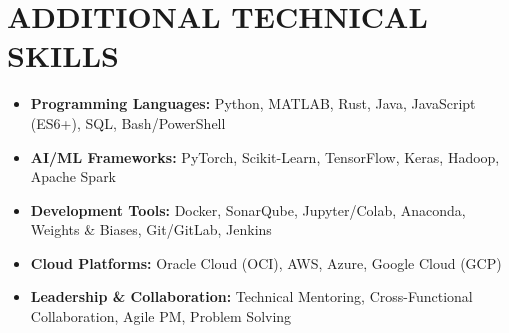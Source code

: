 \documentclass[a4paper,11pt]{article}
\begin{document}
\section{ADDITIONAL TECHNICAL SKILLS}
\begin{itemize}[leftmargin=0.15in, label={}]
    \small\item \textbf{Programming Languages:} Python, MATLAB, Rust, Java, JavaScript (ES6+), SQL, Bash/PowerShell
    \small\item \textbf{AI/ML Frameworks:} PyTorch, Scikit-Learn, TensorFlow, Keras, Hadoop, Apache Spark
    \small\item \textbf{Development Tools:} Docker, SonarQube, Jupyter/Colab, Anaconda, Weights \& Biases, Git/GitLab, Jenkins
    \small\item \textbf{Cloud Platforms:} Oracle Cloud (OCI), AWS, Azure, Google Cloud (GCP)
    \small\item \textbf{Leadership \& Collaboration:} Technical Mentoring, Cross-Functional Collaboration, Agile PM, Problem Solving
\end{itemize}
\end{document}

